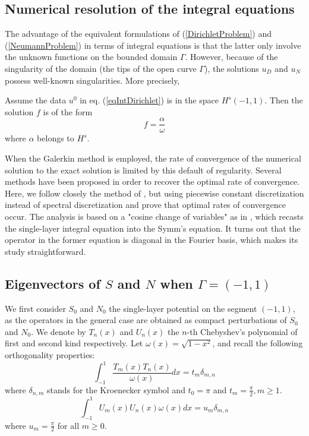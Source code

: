 \documentclass[10pt,a4paper]{article}
\begin{document}
\subsection*{Numerical resolution of the integral equations}

The advantage of the equivalent formulations of (\ref{DirichletProblem}) and (\ref{NeumannProblem}) in terms of integral equations is that the latter only involve the unknown functions on the bounded domain $\Gamma$. However, because of the singularity of the domain (the tips of the open curve $\Gamma$), the solutions $u_D$ and $u_N$ possess well-known singularities. More precisely, 

\begin{The}
	Assume the data $u^0$ in eq. (\ref{eqIntDirichlet}) is in the space $H^{s}(-1,1)$. Then the solution $f$ is of the form 
	\[ f = \frac{\alpha}{\omega}\]
	where $\alpha$ belongs to $H^s$. 
\end{The}



When the Galerkin method is employed, the rate of convergence of the numerical solution to the exact solution is limited by this default of regularity. Several methods have been proposed in order to recover the optimal rate of convergence. Here, we follow closely the method of \cite{bruno2012second}, but using piecewise constant discretization instead of spectral discretization and prove that optimal rates of convergence occur. The analysis is based on a "cosine change of variables" as in \cite{yan1988integral,yan1990cosine,bruno2012second}, which recasts the single-layer integral equation into the Symm's equation. It turns out that the operator in the former equation is diagonal in the Fourier basis, which makes its study straightforward.  




\subsection{Eigenvectors of $S$ and $N$ when $\Gamma = (-1,1)$}

We first consider $S_0$ and $N_0$ the single-layer potential
on the segment $(-1,1)$, as the operators in the general case are obtained as compact perturbations of $S_0$ and $N_0$. We denote by $T_n(x)$ and $U_n(x)$ the $n$-th Chebyshev's polynomial of first and second kind respectively. Let $\omega(x) = \sqrt{1 - x^2}$, and recall the following orthogonality properties: 
\begin{equation}
	\int_{-1}^{1} \frac{T_m(x)T_n(x)}{\omega(x)}dx = t_m \delta_{m,n}
\end{equation}
where $\delta_{n,m}$ stands for the Kroenecker symbol and $t_0 = \pi$ and $t_m = \frac{\pi}{2}, m \geq 1$.  
\begin{equation}
\int_{-1}^{1} {U_m(x)U_n(x)}{\omega(x)}dx = u_m \delta_{m,n}
\end{equation}
where $u_m = \frac{\pi}{2}$ for all $m \geq 0$. 
\end{document}
